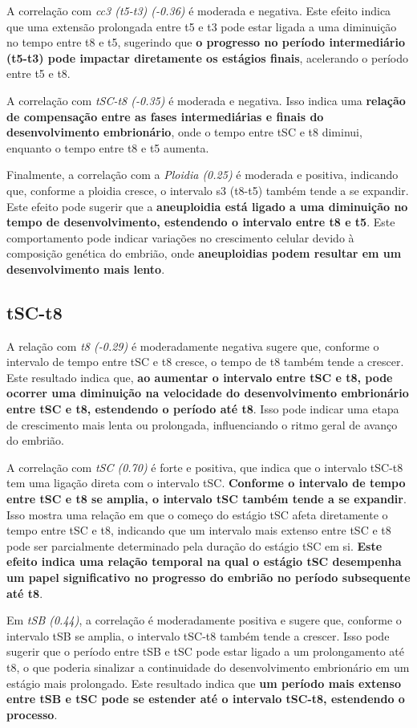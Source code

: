 A correlação com \textit{cc3 (t5-t3) (-0.36)} é moderada e negativa. Este efeito indica que uma extensão prolongada entre t5 e t3 pode estar ligada a uma diminuição no tempo entre t8 e t5, sugerindo que \textbf{o progresso no período intermediário (t5-t3) pode impactar diretamente os estágios finais}, acelerando o período entre t5 e t8.

A correlação com \textit{tSC-t8 (-0.35)} é moderada e negativa. Isso indica uma \textbf{relação de compensação entre as fases intermediárias e finais do desenvolvimento embrionário}, onde o tempo entre tSC e t8 diminui, enquanto o tempo entre t8 e t5 aumenta.

Finalmente, a correlação com a \textit{Ploidia (0.25)} é moderada e positiva, indicando que, conforme a ploidia cresce, o intervalo s3 (t8-t5) também tende a se expandir. Este efeito pode sugerir que a \textbf{aneuploidia está ligado a uma diminuição no tempo de desenvolvimento, estendendo o intervalo entre t8 e t5}. Este comportamento pode indicar variações no crescimento celular devido à composição genética do embrião, onde \textbf{aneuploidias podem resultar em um desenvolvimento mais lento}.

\subsection*{tSC-t8}
A relação com \textit{t8 (-0.29)} é moderadamente negativa sugere que, conforme o intervalo de tempo entre tSC e t8 cresce, o tempo de t8 também tende a crescer. Este resultado indica que,\textbf{ ao aumentar o intervalo entre tSC e t8, pode ocorrer uma diminuição na velocidade do desenvolvimento embrionário entre tSC e t8, estendendo o período até t8}. Isso pode indicar uma etapa de crescimento mais lenta ou prolongada, influenciando o ritmo geral de avanço do embrião.

A correlação com \textit{tSC (0.70)} é forte e positiva, que indica que o intervalo tSC-t8 tem uma ligação direta com o intervalo tSC. \textbf{Conforme o intervalo de tempo entre tSC e t8 se amplia, o intervalo tSC também tende a se expandir}. Isso mostra uma relação em que o começo do estágio tSC afeta diretamente o tempo entre tSC e t8, indicando que um intervalo mais extenso entre tSC e t8 pode ser parcialmente determinado pela duração do estágio tSC em si. \textbf{Este efeito indica uma relação temporal na qual o estágio tSC desempenha um papel significativo no progresso do embrião no período subsequente até t8}.

Em \textit{tSB (0.44)}, a correlação é moderadamente positiva e sugere que, conforme o intervalo tSB se amplia, o intervalo tSC-t8 também tende a crescer. Isso pode sugerir que o período entre tSB e tSC pode estar ligado a um prolongamento até t8, o que poderia sinalizar a continuidade do desenvolvimento embrionário em um estágio mais prolongado. Este resultado indica que\textbf{ um período mais extenso entre tSB e tSC pode se estender até o intervalo tSC-t8, estendendo o processo}.

